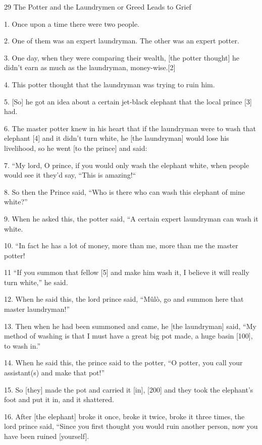 
{\LARGE{}29 The Potter and the Laundrymen or Greed Leads to Grief}

{\LARGE{}1. Once upon a time there were two people.}

{\LARGE{}2. One of them was an expert laundryman. The other was an expert potter.}

{\LARGE{}3. One day, when they were comparing their wealth, [the potter thought]
he didn't earn as much as the laundryman, money-wise.[2]}

{\LARGE{}4. This potter thought that the laundryman was trying to ruin him.}

{\LARGE{}5. [So] he got an idea about a certain jet-black elephant that the local
prince [3] had.}

{\LARGE{}6. The master potter knew in his heart that if the laundryman were to
wash that elephant [4] and it didn't turn white, he [the laundryman] would lose
his livelihood, so he went [to the prince] and said:}

{\LARGE{}7. ``My lord, O prince, if you would only wash the elephant white, when
people would see it they'd say, ``This is amazing!``}

{\LARGE{}8. So then the Prince said, ``Who is there who can wash this elephant
of mine white?''}

{\LARGE{}9. When he asked this, the potter said, ``A certain expert laundryman
can wash it white.}

{\LARGE{}10. ``In fact he has a lot of money, more than me, more than me the master
potter!}

{\LARGE{}11 ``If you summon that fellow [5] and make him wash it, I believe it
will really turn white,'' he said.}

{\LARGE{}12. When he said this, the lord prince said, ``Mûlò, go and summon here
that master laundryman!''}

{\LARGE{}13. Then when he had been summoned and came, he [the laundryman] said,
``My method of washing is that I must have a great big pot made, a huge basin [100],
to wash in.''}

{\LARGE{}14. When he said this, the prince said to the potter, ``O potter, you
call your assistant(s) and make that pot!''}

{\LARGE{}15. So [they] made the pot and carried it [in], [200] and they took the
elephant's foot and put it in, and it shattered.}

{\LARGE{}16. After [the elephant] broke it once, broke it twice, broke it three
times, the lord prince said, ``Since you first thought you would ruin another person,
now you have been ruined [yourself].}

